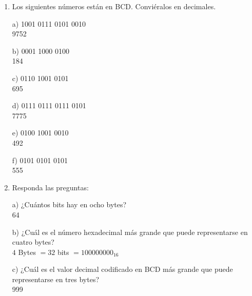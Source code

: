 \documentclass[a4paper, 12pt]{article}
\newcommand{\Aspace}{0.2cm}
\begin{document}
\begin{enumerate}
 
        \item Los siguientes números están en BCD. Conviéralos en decimales.
            \vspace{\Aspace} \par
            a) 1001 0111 0101 0010
            \\ { \color{azul} 9752 }

            \vspace{\Aspace} \par
            b) 0001 1000 0100
            \\ { \color{azul} 184 }

            \vspace{\Aspace} \par
            c) 0110 1001 0101
            \\ { \color{azul} 695 }

            \vspace{\Aspace} \par
            d) 0111 0111 0111 0101
            \\ { \color{azul} 7775 }

            \vspace{\Aspace} \par
            e) 0100 1001 0010
            \\ { \color{azul} 492 }

            \vspace{\Aspace} \par
            f) 0101 0101 0101
            \\ { \color{azul} 555 }


        \item Responda las preguntas:
            \vspace{\Aspace} \par
            a) ¿Cuántos bits hay en ocho bytes?
            \\ { \color{azul} 64 }

            \vspace{\Aspace} \par
            b) ¿Cuál es el número hexadecimal más grande que puede representarse en cuatro bytes?
            \\ { \color{azul} $4$ Bytes $= 32$ bits $= 100000000_{16}$}

            \vspace{\Aspace} \par
            c) ¿Cuál es el valor decimal codificado en BCD más grande que puede representarse en tres bytes?
            \\ { \color{azul} 999 }



\end{enumerate}
\end{document}
